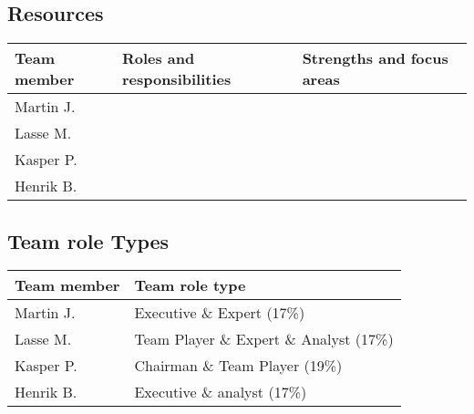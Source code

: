 \subsection{Resources}

\begin{table}
    \centering
    \begin{tabular}{l|l|l}
        \rowcolor{Gray}
        \textbf{Team member} & \textbf{Roles and responsibilities} & \textbf{Strengths and focus areas}\\\hline
        Martin J.            & &\\
        Lasse M.             & &\\
        Kasper P.            & &\\
        Henrik B.            & &
    \end{tabular}
    \label{tab:resources}
\end{table}

\subsection{Team role Types}

\begin{table}
    \centering
    \begin{tabular}{l|l}
        \rowcolor{Gray}
        \textbf{Team member} & \textbf{Team role type}\\\hline
        Martin J.            & Executive \& Expert (17\%) \\
        Lasse M.             & Team Player \& Expert \& Analyst (17\%) \\
        Kasper P.            & Chairman \& Team Player (19\%) \\
        Henrik B.            & Executive \& analyst (17\%)
    \end{tabular}
    \label{tab:roleTypes}
\end{table}
